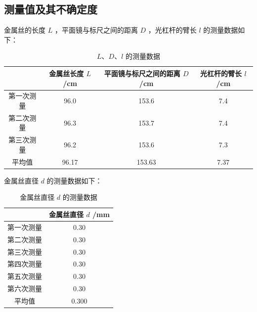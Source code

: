 \documentclass[a4paper]{extarticle}
\begin{document}
    \subsection{测量值及其不确定度}
    \hspace{2em}
    金属丝的长度 $L$ ，平面镜与标尺之间的距离 $D$ ，光杠杆的臂长 $l$ 的测量数据如下：
    \begin{table}[H]
        \centering
        \caption{$L$、$D$、$l$ 的测量数据}
        \begin{tabular}{cccc}
            \toprule
             & 金属丝长度 $L$ /cm & 平面镜与标尺之间的距离 $D$ /cm & 光杠杆的臂长 $l$/cm\\
            \midrule
            第一次测量 & 96.0 & 153.6 & 7.4\\
            第二次测量 & 96.3 & 153.7 & 7.4\\
            第三次测量 & 96.2 & 153.6 & 7.3\\
            \midrule
            平均值 & 96.17 & 153.63 & 7.37\\
            \bottomrule
        \end{tabular}
    \end{table}
    \hspace{2em}
    金属丝直径 $d$ 的测量数据如下：
    \begin{table}[H]
        \centering
        \caption{金属丝直径 $d$ 的测量数据}
        \begin{tabular}{cc}
            \toprule
             & 金属丝直径 $d$ /mm\\
            \midrule
            第一次测量 & 0.30\\
            第二次测量 & 0.30\\
            第三次测量 & 0.30\\
            第四次测量 & 0.30\\
            第五次测量 & 0.30\\
            第六次测量 & 0.30\\
            \midrule
            平均值 & 0.300\\
            \bottomrule
        \end{tabular}
    \end{table}
\end{document}
